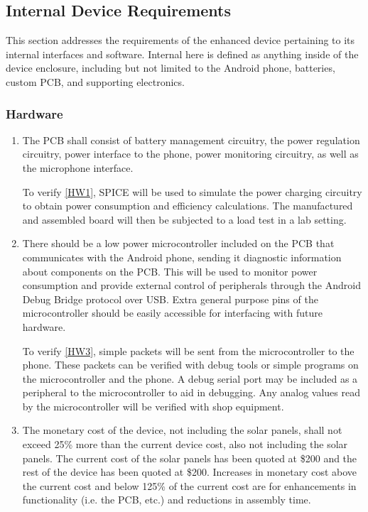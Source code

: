 \documentclass{article}
\numberwithin{figure}{section}
\numberwithin{equation}{section}
\begin{document}
{\subsection{Internal Device Requirements} \label{sect:internaldev}
This section addresses the requirements of the enhanced device pertaining to its internal interfaces and software. Internal here is defined as anything inside of the device enclosure, including but not limited to the Android phone, batteries, custom PCB, and supporting electronics.

\subsubsection{Hardware} \label{sect:hardware2}
\begin{enumerate}[align=left,leftmargin=*, labelindent= 0em, label=\textbf{Requirement \thesubsubsection.\arabic*.}, itemindent=0em]
\item \label{HW1}The PCB shall consist of battery management circuitry, the power regulation circuitry, power interface to the phone, power monitoring circuitry, as well as the microphone interface.

\baselinestretch
To verify \ref{HW1}, SPICE will be used to simulate the power charging circuitry to obtain power consumption and efficiency calculations. The manufactured and assembled board will then be subjected to a load test in a lab setting.

\item \label{HW3}There should be a low power microcontroller included on the PCB that communicates with the Android phone, sending it diagnostic information about components on the PCB. This will be used to monitor power consumption and provide external control of peripherals through the Android Debug Bridge protocol over USB. Extra general purpose pins of the microcontroller should be easily accessible for interfacing with future hardware.

\baselinestretch
To verify \ref{HW3}, simple packets will be sent from the microcontroller to the phone. These packets can be verified with debug tools or simple programs on the microcontroller and the phone. A debug serial port may be included as a peripheral to the microcontroller to aid in debugging. Any analog values read by the microcontroller will be verified with shop equipment.

\item \label{HW4} The monetary cost of the device, not including the solar panels, shall not exceed 25\% more than the current device cost, also not including the solar panels. The current cost of the solar panels has been quoted at \$200 and the rest of the device has been quoted at \$200. Increases in monetary cost above the current cost and below 125\% of the current cost are for enhancements in functionality (i.e. the PCB, etc.) and reductions in assembly time.


\end{enumerate}}
\end{document}
